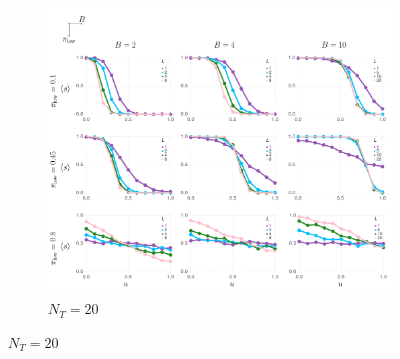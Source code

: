 \documentclass[letterpaper,11.5pt]{scrartcl}
\begin{document}
\newpage
\begin{figure}
  \ContinuedFloat
  \begin{subfigure}{\textwidth}
	\caption{$N_T = 20$}
	\includegraphics[width=\textwidth]{Figures/supplement/nteachers=20/mainResultsPlots.pdf}
  \end{subfigure}
\end{figure}
\end{document}
